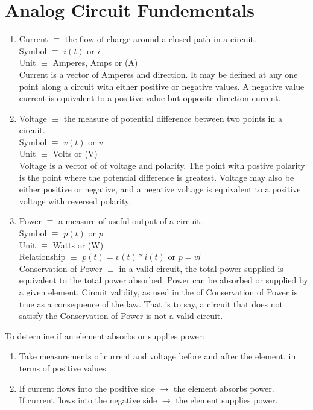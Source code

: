 \documentclass{article}
\begin{document}
\section{Analog Circuit Fundementals}
\begin{enumerate}
  \item {
  Current $\equiv$ the flow of charge around a closed path in a circuit.\\
  Symbol $\equiv$ $i(t)$ or $i$\\
  Unit $\equiv$ Amperes, Amps or (A)\\
  Current is a vector of Amperes and direction. It may be defined at any one point along a circuit with either positive or negative values. A negative value current is equivalent to a positive value but opposite direction current.
  }
  \item {
  Voltage $\equiv$ the measure of potential difference between two points in a circuit.\\
  Symbol $\equiv$ $v(t)$ or $v$\\
  Unit $\equiv$ Volts or (V)\\
  Voltage is a vector of of voltage and polarity. The point with postive polarity is the point where the potential difference is greatest. Voltage may also be either positive or negative, and a negative voltage is equivalent to a positive voltage with reversed polarity.
  }
  \item {
  Power $\equiv$ a measure of useful output of a circuit.\\
  Symbol $\equiv$ $p(t)$ or $p$\\
  Unit $\equiv$ Watts or (W)\\
  Relationship $\equiv$ $p(t) = v(t) * i(t)$ or $p = vi$\\
  Conservation of Power $\equiv$ in a valid circuit, the total power supplied is equivalent to the total power absorbed.
  Power can be absorbed or supplied by a given element. Circuit validity, as used in the of Conservation of Power is true as a consequence of the law. That is to say, a circuit that does not satisfy the Conservation of Power is not a valid circuit.
  }
\end{enumerate}

To determine if an element absorbs or supplies power:
\begin{enumerate}
  \item Take measurements of current and voltage before and after the element, in terms of positive values.
  \item {
  If current flows into the positive side $\to$ the element absorbs power.\\
  If current flows into the negative side $\to$ the element supplies power.
  }
\end{enumerate}
\end{document}
